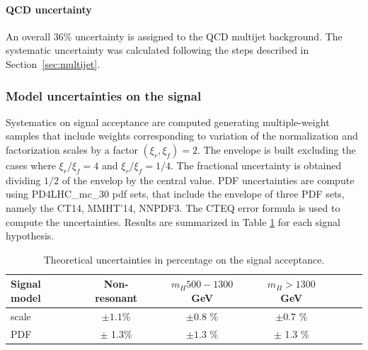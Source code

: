 \paragraph{QCD uncertainty}
An overall 36\% uncertainty is assigned to the QCD multijet background. The systematic uncertainty was calculated following the steps described in Section~\ref{sec:multijet}. 


\subsubsection{Model uncertainties on the signal}

Systematics on signal acceptance are computed generating
multiple-weight samples that include weights corresponding to
variation of the normalization and factorization scales by a factor
$(\xi_r, \xi_f)= 2$. The envelope is built excluding the cases where
$\xi_r/\xi_f = 4$ and $\xi_r/\xi_f = 1/4$. The fractional uncertainty
is obtained dividing $1/2$ of the envelop by the central value.
PDF uncertainties are compute using PD4LHC\_mc\_30 pdf sets, that
include the envelope of three PDF sets, namely the CT14, MMHT'14,
NNPDF3. The CTEQ error formula is used to compute the uncertainties.
Results are summarized in Table \ref{tab:sig_systs} for each signal
hypothesis.

\begin{table}
\centering
\begin{tabular}{l|cc|cc|cc}
\hline
Signal model               & Non-resonant 	& $m_H 500 -1300$ GeV & $m_H > 1300$ GeV    \\\hline 
\hline
scale & $\pm 1.1$\% & $\pm 0.8$ \% & $\pm 0.7$ \% \\
PDF & $\pm$ 1.3\% & $\pm 1.3$ \% & $\pm$ 1.3 \% \\
\hline
\end{tabular}
\caption{Theoretical uncertainties in percentage on the signal acceptance.}

\label{tab:sig_systs}
\end{table}

